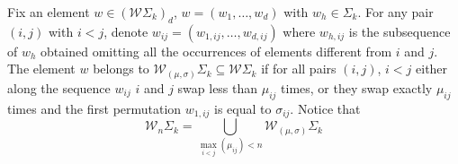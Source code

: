 	\begin{definition}
	Fix an element  $w\in (\mathcal{W}\Sigma_k)_{d}$, $w=(w_{1},\dots , w_{d})$ with $w_{h}\in \Sigma_k$. For any pair $(i,j)$ with $i< j$, denote $w_{ij}=(w_{1,ij},\dots , w_{d,ij})$ where $w_{h,ij}$ is the subsequence of $w_{h}$ obtained omitting all the occurrences of elements different from $i$ and $j$.
	The element $w$ belongs to $\mathcal{W}_{(\mu,\sigma)}\Sigma_k\subseteq \mathcal{W}\Sigma_k$ if for all pairs $(i,j)$, $i< j$ either along the sequence $w_{ij}$ $i$ and $j$ swap less than $\mu_{ij}$ times,
	 or they swap exactly $\mu_{ij}$ times and the first permutation $w_{1,ij}$ is equal to $\sigma_{ij}$. Notice that
	  \begin{equation*}
	 	\label{def}
	 	\mathcal{W}_{n}\Sigma_k=\bigcup_{\max_{i<j} (\mu_{ij})< n} \mathcal{W}_{(\mu,\sigma)}\Sigma_{k}
	 \end{equation*}
	\\
	\\

\end{definition}

